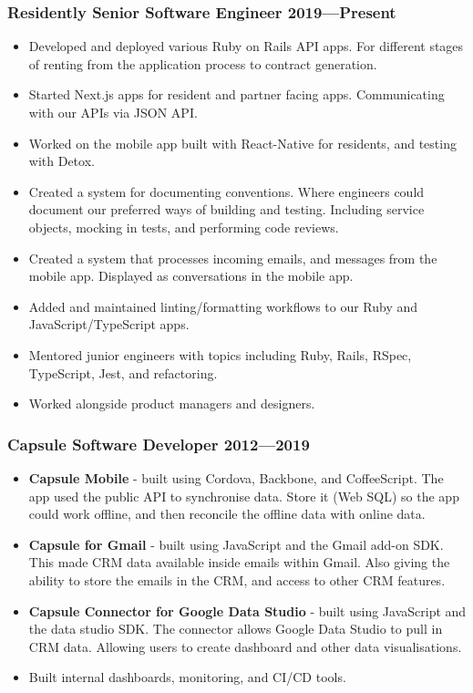 \documentclass[a4paper]{article}
\newcommand{\datedsubsection}[2]{
  \subsubsection{#1 \hfill \textbf{#2}}
}
\begin{document}
\datedsubsection{\textbf{Residently} Senior Software Engineer}{2019---Present}
\begin{itemize}
  \item Developed and deployed various Ruby on Rails API apps. For different stages of renting from the application process to contract generation.
  \item Started Next.js apps for resident and partner facing apps. Communicating with our APIs via JSON API.
  \item Worked on the mobile app built with React-Native for residents, and testing with Detox.
  \item Created a system for documenting conventions. Where engineers could document our preferred ways of building and testing. Including service objects, mocking in tests, and performing code reviews.
  \item Created a system that processes incoming emails, and messages from the mobile app. Displayed as conversations in the mobile app.
  \item Added and maintained linting/formatting workflows to our Ruby and JavaScript/TypeScript apps.
  \item Mentored junior engineers with topics including Ruby, Rails, RSpec, TypeScript, Jest, and refactoring.
  \item Worked alongside product managers and designers.
\end{itemize}

\datedsubsection{\textbf{Capsule} Software Developer}{2012---2019}
\begin{itemize}
  \item \textbf{Capsule Mobile} - built using Cordova, Backbone, and CoffeeScript. The app used the public API to synchronise data. Store it (Web SQL) so the app could work offline, and then reconcile the offline data with online data. 
  \item \textbf{Capsule for Gmail} - built using JavaScript and the Gmail add-on SDK. This made CRM data available inside emails within Gmail. Also giving the ability to store the emails in the CRM, and access to other CRM features. 
  \item \textbf{Capsule Connector for Google Data Studio} - built using JavaScript and the data studio SDK. The connector allows Google Data Studio to pull in CRM data. Allowing users to create dashboard and other data visualisations.
  \item Built internal dashboards, monitoring, and CI/CD tools.
\end{itemize}
\end{document}
